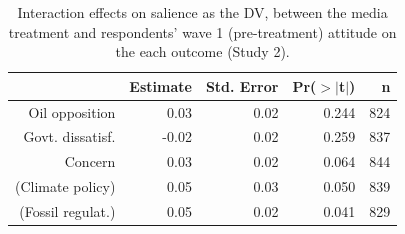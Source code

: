 \begin{table}[ht]
\centering
\caption{Interaction effects on salience as the DV, between the media
             treatment and respondents' wave 1 (pre-treatment) attitude on the each outcome (Study 2).} 
\label{tab:disruption_salience_bywave1_2}
\begin{tabular}{rrrrr}
  \hline
 & Estimate & Std. Error & Pr($>$$|$t$|$) & n \\ 
  \hline
Oil opposition & 0.03 & 0.02 & 0.244 & 824 \\ 
  Govt. dissatisf. & -0.02 & 0.02 & 0.259 & 837 \\ 
  Concern & 0.03 & 0.02 & 0.064 & 844 \\ 
  (Climate policy) & 0.05 & 0.03 & 0.050 & 839 \\ 
  (Fossil regulat.) & 0.05 & 0.02 & 0.041 & 829 \\ 
   \hline
\end{tabular}
\end{table}
